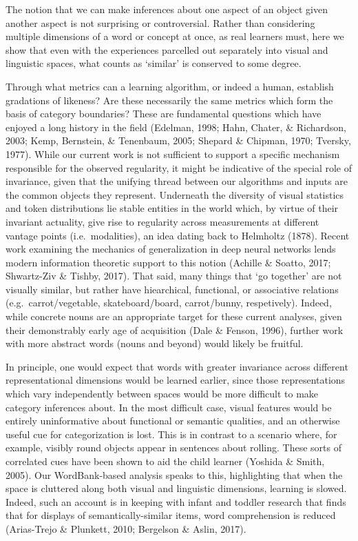 \documentclass[10pt, letterpaper]{article}
\begin{document}
The notion that we can make inferences about one aspect of an object
given another aspect is not surprising or controversial. Rather than
considering multiple dimensions of a word or concept at once, as real
learners must, here we show that even with the experiences parcelled out
separately into visual and linguistic spaces, what counts as `similar'
is conserved to some degree.

Through what metrics can a learning algorithm, or indeed a human,
establish gradations of likeness? Are these necessarily the same metrics
which form the basis of category boundaries? These are fundamental
questions which have enjoyed a long history in the field (Edelman, 1998;
Hahn, Chater, \& Richardson, 2003; Kemp, Bernstein, \& Tenenbaum, 2005;
Shepard \& Chipman, 1970; Tversky, 1977). While our current work is not
sufficient to support a specific mechanism responsible for the observed
regularity, it might be indicative of the special role of invariance,
given that the unifying thread between our algorithms and inputs are the
common objects they represent. Underneath the diversity of visual
statistics and token distributions lie stable entities in the world
which, by virtue of their invariant actuality, give rise to regularity
across measurements at different vantage points (i.e.~modalities), an
idea dating back to Helmholtz (1878). Recent work examining the
mechanics of generalization in deep neural networks lends modern
information theoretic support to this notion (Achille \& Soatto, 2017;
Shwartz-Ziv \& Tishby, 2017). That said, many things that `go together'
are not visually similar, but rather have hiearchical, functional, or
associative relations (e.g.~carrot/vegetable, skateboard/board,
carrot/bunny, respetively). Indeed, while concrete nouns are an
appropriate target for these current analyses, given their demonstrably
early age of acquisition (Dale \& Fenson, 1996), further work with more
abstract words (nouns and beyond) would likely be fruitful.

In principle, one would expect that words with greater invariance across
different representational dimensions would be learned earlier, since
those representations which vary independently between spaces would be
more difficult to make category inferences about. In the most difficult
case, visual features would be entirely uninformative about functional
or semantic qualities, and an otherwise useful cue for categorization is
lost. This is in contrast to a scenario where, for example, visibly
round objects appear in sentences about rolling. These sorts of
correlated cues have been shown to aid the child learner (Yoshida \&
Smith, 2005). Our WordBank-based analysis speaks to this, highlighting
that when the space is cluttered along both visual and linguistic
dimensions, learning is slowed. Indeed, such an account is in keeping
with infant and toddler research that finds that for displays of
semantically-similar items, word comprehension is reduced (Arias-Trejo
\& Plunkett, 2010; Bergelson \& Aslin, 2017).
\end{document}
